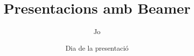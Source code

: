 \documentclass{beamer}
\title{Presentacions amb Beamer}
\author{Jo}
\institute{CLiC}
\date{Dia de la presentació}
\begin{document}
\begin{frame}
\titlepage %
\end{frame}
\end{document}
